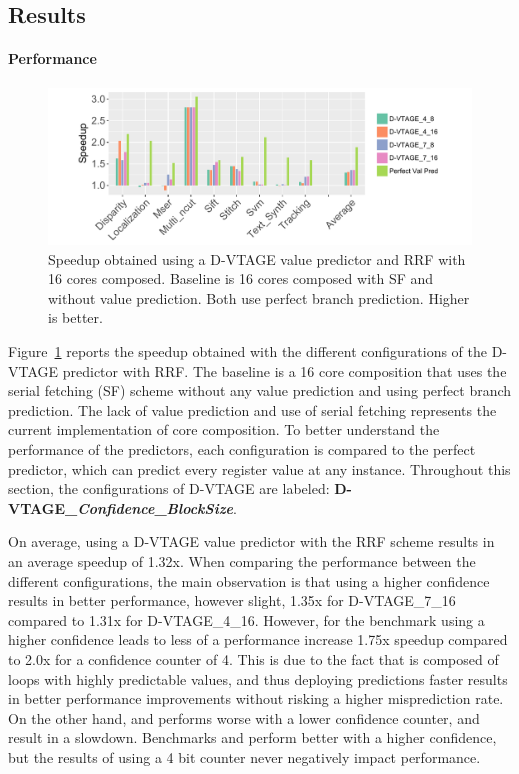 \subsection{Results}

\paragraph*{Performance}

\begin{figure}[t]
    \centering
    \includegraphics[width=1\textwidth]{chapter3/graphics/vtage_speed2.pdf}
    \caption{Speedup obtained using a D-VTAGE value predictor and RRF with 16 cores composed. Baseline is 16 cores composed with SF and without value prediction. Both use perfect branch prediction. Higher is better.}
    \label{fig:vtage_perf}
	\vspace{1em}
\end{figure}

Figure~\ref{fig:vtage_perf} reports the speedup obtained with the different configurations of the D-VTAGE predictor with RRF.
The baseline is a 16 core composition that uses the serial fetching (SF) scheme without any value prediction and using perfect branch prediction.
The lack of value prediction and use of serial fetching represents the current implementation of core composition.
To better understand the performance of the predictors, each configuration is compared to the perfect predictor, which can predict every register value at any instance.
Throughout this section, the configurations of D-VTAGE are labeled: \textbf{D-VTAGE\_\textit{Confidence}\_\textit{BlockSize}}.

On average, using a D-VTAGE value predictor with the RRF scheme results in an average speedup of 1.32x.
When comparing the performance between the different configurations, the main observation is that using a higher confidence results in better performance, however slight, 1.35x for D-VTAGE\_7\_16 compared to 1.31x for D-VTAGE\_4\_16.
However, for the benchmark  using a higher confidence leads to less of a performance increase 1.75x speedup compared to 2.0x for a confidence counter of 4.
This is due to the fact that  is composed of loops with highly predictable values, and thus deploying predictions faster results in better performance improvements without risking a higher misprediction rate.
On the other hand,  and  performs worse with a lower confidence counter, and result in a slowdown.
Benchmarks  and  perform better with a higher confidence, but the results of using a 4 bit counter never negatively impact performance.

